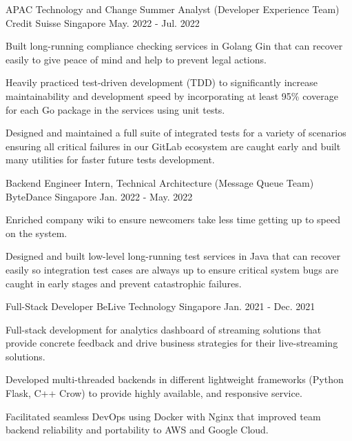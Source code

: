 \begin{cventries}
  \cventry
    {APAC Technology and Change Summer Analyst (Developer Experience Team)} %
    {Credit Suisse} %
    {Singapore} %
    {May. 2022 - Jul. 2022} %
    {
      \begin{cvitems} %
        \item {Built long-running compliance checking services in Golang Gin that can recover easily to give peace of mind and help to prevent legal actions.}
        \item {Heavily practiced test-driven development (TDD) to significantly increase maintainability and development speed by incorporating at least 95\% coverage for each Go package in the services using unit tests.}
        \item {Designed and maintained a full suite of integrated tests for a variety of scenarios ensuring all critical failures in our GitLab ecosystem are caught early and built many utilities for faster future tests development.}
      \end{cvitems}
    }

  \cventry
    {Backend Engineer Intern, Technical Architecture (Message Queue Team)} %
    {ByteDance} %
    {Singapore} %
    {Jan. 2022 - May. 2022} %
    {
      \begin{cvitems} %
        \item {Enriched company wiki to ensure newcomers take less time getting up to speed on the system.}
        \item {Designed and built low-level long-running test services in Java that can recover easily so integration test cases are always up to ensure critical system bugs are caught in early stages and prevent catastrophic failures.}
      \end{cvitems}
    }

  \cventry
    {Full-Stack Developer} %
    {BeLive Technology} %
    {Singapore} %
    {Jan. 2021 - Dec. 2021} %
    {
      \begin{cvitems} %
        \item {Full-stack development for analytics dashboard of streaming solutions that provide concrete feedback and drive business strategies for their live-streaming solutions.}
        \item {Developed multi-threaded backends in different lightweight frameworks (Python Flask, C++ Crow) to provide highly available, and responsive service.}
        \item {Facilitated seamless DevOps using Docker with Nginx that improved team backend reliability and portability to AWS and Google Cloud.}
      \end{cvitems}
    }


\end{cventries}

